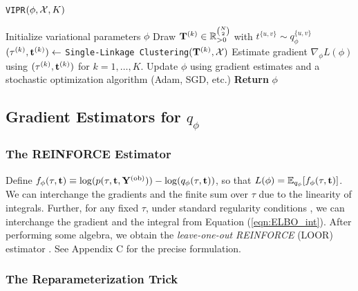\begin{algorithm}[ht]
\caption{{\tt VIPR}$(\phi,\mathcal{X},K)$}\label{alg:VIPR}
\begin{algorithmic}[1]
\STATE Initialize variational parameters $\phi$
%
        \STATE Draw $\mathbf{T}^{(k)} \in \mathbb{R}_{>0}^{\binom{N}{2}}$ with $t^{\{u,v\}} \sim q_{\phi}^{\{u,v\}}$
        \STATE $(\tau^{(k)},\mathbf{t}^{(k)}) \gets$ \texttt{Single-Linkage Clustering}$(\mathbf{T}^{(k)},\mathcal{X})$
    \ENDFOR
    \STATE Estimate gradient $\nabla_\phi L(\phi)$ using $(\tau^{(k)},\mathbf{t}^{(k)})$ for $k = 1,\ldots,K$.
    \STATE Update $\phi$ using gradient estimates and a stochastic optimization algorithm (Adam, SGD, etc.)
\ENDWHILE
%
\STATE \textbf{Return} $\phi$ 
\end{algorithmic}
\end{algorithm}

\subsection{Gradient Estimators for $q_\phi$} \label{sec:grad}


\subsubsection{The REINFORCE Estimator}

Define $f_{\phi}(\tau,\mathbf{t}) \equiv \log(p(\tau,\mathbf{t},\mathbf{Y}^{{(\text{ob})}})) - \log(q_{\phi}(\tau,\mathbf{t}))$, so that $L(\phi) = \mathbb{E}_{q_\phi}[f_{\phi}(\tau,\mathbf{t})]$. We can interchange the gradients and the finite sum over $\tau$ due to the linearity of integrals. Further, for any fixed $\tau$, under standard regularity conditions \citep{Lecuyer:1995}, we can interchange the gradient and the integral from Equation (\ref{eqn:ELBO_int}). After performing some algebra, we obtain the \textit{leave-one-out REINFORCE} (LOOR) estimator \citep{Mnih:2014,Shi:2022}. See Appendix C for the precise formulation.

\subsubsection{The Reparameterization Trick}


